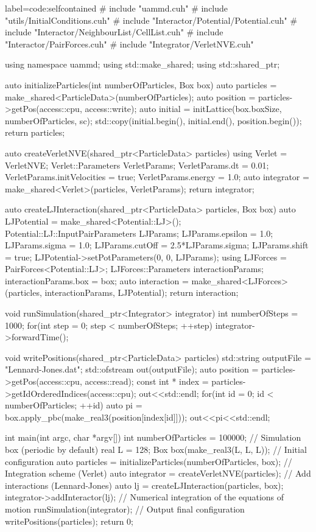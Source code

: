 \documentclass[twoside,openright,titlepage,numbers=noenddot,%
headinclude,footinclude,cleardoublepage=empty,abstract=on,
BCOR=5mm,fontsize=11pt, dvipsnames, paper=b5
]{scrreprt}
\begin{document}
\begin{code2}{label=code:selfcontained}
# include "uammd.cuh"
# include "utils/InitialConditions.cuh"
# include "Interactor/Potential/Potential.cuh"
# include "Interactor/NeighbourList/CellList.cuh"
# include "Interactor/PairForces.cuh"
# include "Integrator/VerletNVE.cuh"

using namespace uammd;
using std::make_shared;
using std::shared_ptr;

auto initializeParticles(int numberOfParticles, Box box){
  auto particles = make_shared<ParticleData>(numberOfParticles);
  auto position = particles->getPos(access::cpu, access::write);
  auto initial =  initLattice(box.boxSize, numberOfParticles, sc);
  std::copy(initial.begin(), initial.end(), position.begin());
  return particles;
}

auto createVerletNVE(shared_ptr<ParticleData> particles){
  using Verlet = VerletNVE;
  Verlet::Parameters VerletParams;
  VerletParams.dt = 0.01;
  VerletParams.initVelocities = true;
  VerletParams.energy = 1.0;
  auto integrator = make_shared<Verlet>(particles, VerletParams);
  return integrator;
}

auto  createLJInteraction(shared_ptr<ParticleData> particles,
			  Box box){
  auto LJPotential = make_shared<Potential::LJ>();
  Potential::LJ::InputPairParameters LJParams;
  LJParams.epsilon = 1.0;
  LJParams.sigma = 1.0;
  LJParams.cutOff = 2.5*LJParams.sigma;
  LJParams.shift = true;
  LJPotential->setPotParameters(0, 0, LJParams);
  using LJForces = PairForces<Potential::LJ>;
  LJForces::Parameters interactionParams;
  interactionParams.box = box;
  auto interaction = make_shared<LJForces>(particles, interactionParams, LJPotential);
  return interaction;
}

void runSimulation(shared_ptr<Integrator> integrator){
  int numberOfSteps = 1000;
  for(int step = 0; step < numberOfSteps; ++step) {
    integrator->forwardTime();
  }
}

void writePositions(shared_ptr<ParticleData> particles){
  std::string outputFile = "Lennard-Jones.dat";
  std::ofstream out(outputFile);
  auto position = particles->getPos(access::cpu, access::read);
  const int * index = particles->getIdOrderedIndices(access::cpu);
  out<<std::endl;
  for(int id = 0; id < numberOfParticles; ++id){    
    auto pi = box.apply_pbc(make_real3(position[index[id]]));
    out<<pi<<std::endl;
  }
}

int main(int argc, char *argv[]){
  int numberOfParticles = 100000;
  // Simulation box (periodic by default)
  real L = 128;
  Box box(make_real3(L, L, L));
  // Initial configuration
  auto particles = initializeParticles(numberOfParticles, box);
  // Integration scheme (Verlet)
  auto integrator = createVerletNVE(particles);
  // Add interactions (Lennard-Jones)
  auto lj = createLJInteraction(particles, box);
  integrator->addInteractor(lj);
  // Numerical integration of the equations of motion
  runSimulation(integrator);
  // Output final configuration
  writePositions(particles);
  return 0;
}
\end{code2}
\end{document}
